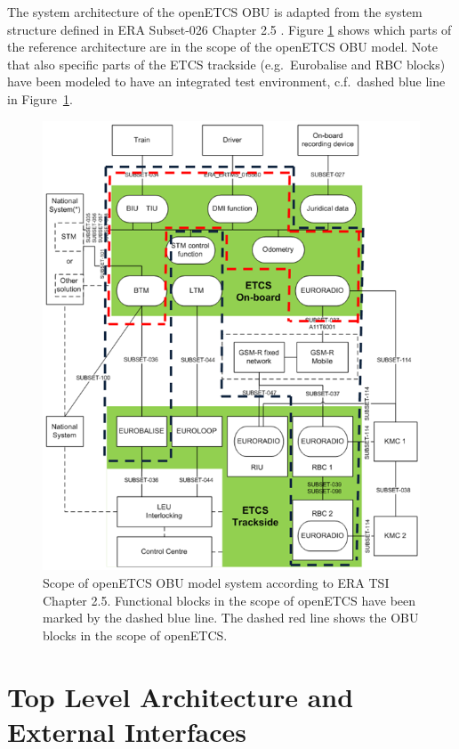 
The system architecture of the openETCS OBU is adapted from the system structure defined in ERA Subset-026 Chapter 2.5 \cite{subset-026}. Figure \ref{f:architecture_srs} shows which parts of the reference architecture are in the scope of the openETCS OBU model. Note that also specific parts of the ETCS trackside (e.g.~Eurobalise and RBC blocks) have been modeled to have an integrated test environment, c.f.~dashed blue line in Figure~\ref{f:architecture_srs}.

\begin{figure}
\centering
\includegraphics[width=.7\textwidth]{images/ArchitectureSRS}
\caption[Scope of openETCS OBU model system according to ERA TSI Chapter 2.5.]{Scope of openETCS OBU model system according to ERA TSI Chapter 2.5. Functional blocks in the scope of openETCS have been marked by the dashed blue line. The dashed red line shows the OBU blocks in the scope of openETCS.}
\label{f:architecture_srs}
\end{figure}


\section{Top Level Architecture and External Interfaces}

